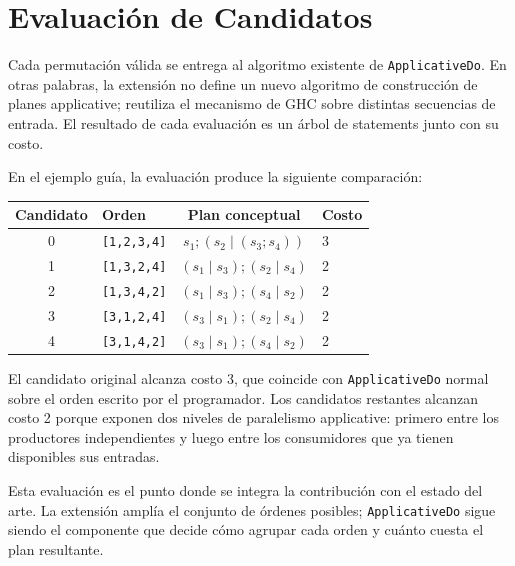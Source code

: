 
\section{Evaluación de Candidatos}

Cada permutación válida se entrega al algoritmo existente de \texttt{ApplicativeDo}. En otras palabras, la extensión no define un nuevo algoritmo de construcción de planes applicative; reutiliza el mecanismo de \textsf{GHC} sobre distintas secuencias de entrada. El resultado de cada evaluación es un árbol de statements junto con su costo.

En el ejemplo guía, la evaluación produce la siguiente comparación:

\begin{center}
\begin{tabular}{clcl}
\hline
Candidato & Orden & Plan conceptual & Costo \\
\hline
0 & \texttt{[1,2,3,4]} & $s_1 ; (s_2 \mid (s_3 ; s_4))$ & 3 \\
1 & \texttt{[1,3,2,4]} & $(s_1 \mid s_3) ; (s_2 \mid s_4)$ & 2 \\
2 & \texttt{[1,3,4,2]} & $(s_1 \mid s_3) ; (s_4 \mid s_2)$ & 2 \\
3 & \texttt{[3,1,2,4]} & $(s_3 \mid s_1) ; (s_2 \mid s_4)$ & 2 \\
4 & \texttt{[3,1,4,2]} & $(s_3 \mid s_1) ; (s_4 \mid s_2)$ & 2 \\
\hline
\end{tabular}
\end{center}

El candidato original alcanza costo 3, que coincide con \texttt{ApplicativeDo} normal sobre el orden escrito por el programador. Los candidatos restantes alcanzan costo 2 porque exponen dos niveles de paralelismo applicative: primero entre los productores independientes y luego entre los consumidores que ya tienen disponibles sus entradas.

Esta evaluación es el punto donde se integra la contribución con el estado del arte. La extensión amplía el conjunto de órdenes posibles; \texttt{ApplicativeDo} sigue siendo el componente que decide cómo agrupar cada orden y cuánto cuesta el plan resultante.
